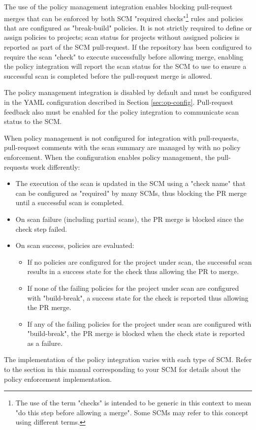 The use of the policy management integration enables blocking pull-request merges that can be enforced by
both SCM "required checks"\footnote{The use of the term "checks" is intended to be
generic in this context to mean "do this step before allowing a merge".  Some SCMs may refer to this concept
using different terms.} rules and \cxone policies that are configured as "break-build" policies.  It is
not strictly required to define or assign policies to \cxone projects; scan status for projects without assigned policies
is reported as part of the SCM pull-request. If the repository has been configured to require the scan
"check" to execute successfully before allowing merge, enabling the policy integration will report
the scan status for the SCM to use to ensure a successful scan is completed before the pull-request merge is allowed.

The policy management integration is disabled by default and must be configured in the YAML configuration
described in Section \ref{sec:op-config}.  Pull-request feedback also must be enabled
for the policy integration to communicate scan status to the SCM.  

When policy management is not configured for integration with pull-requests,
pull-request comments with the scan summary are managed by \cxoneflow
with no policy enforcement.  When the \cxoneflow configuration enables policy management,
the pull-requests work differently:

\begin{itemize}
    \item The execution of the scan is updated in the SCM using a "check name" that can be configured
    as "required" by many SCMs, thus blocking the PR merge until a successful scan is completed.
    \item On scan failure (including partial scans), the PR merge is
    blocked since the check step failed.
    \item On scan success, policies are evaluated:
    \begin{itemize}
        \item If no policies are configured for the project under scan, the
        successful scan results in a success state for the check thus allowing the PR to merge.
        \item If none of the failing policies for the project under scan are
        configured with "build-break", a success state for the check is reported thus allowing the PR merge.
        \item If any of the failing policies for the project under
        scan are configured with "build-break", the PR merge is blocked when the check state is reported
        as a failure.

    \end{itemize}
\end{itemize}

The implementation of the policy integration varies with each type of SCM.
Refer to the section in this manual corresponding to your SCM for details
about the policy enforcement implementation.

